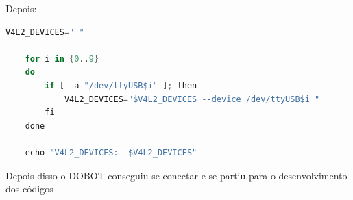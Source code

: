 Depois:

\begin{lstlisting}[language=Awk]
    V4L2_DEVICES=" "

    for i in {0..9}
    do
        if [ -a "/dev/ttyUSB$i" ]; then
            V4L2_DEVICES="$V4L2_DEVICES --device /dev/ttyUSB$i "
        fi
    done

    echo "V4L2_DEVICES:  $V4L2_DEVICES"
\end{lstlisting}

Depois disso o DOBOT conseguiu se conectar e se partiu para o desenvolvimento dos códigos